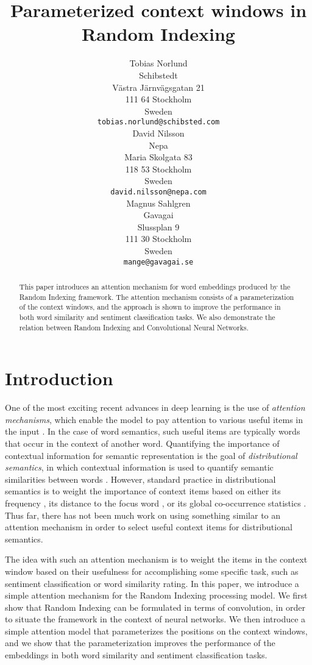 \documentclass[11pt]{article}
\title{Parameterized context windows in Random Indexing}
\author{Tobias Norlund \\
	Schibstedt \\
    Västra Järnvägsgatan 21 \\
    111 64 Stockholm \\
    Sweden \\
	{\tt tobias.norlund@schibsted.com} \\\And
    David Nilsson \\
    Nepa \\
    Maria Skolgata 83 \\
    118 53 Stockholm \\
    Sweden \\
    {\tt david.nilsson@nepa.com} \\\And
    Magnus Sahlgren \\
  	Gavagai \\
  	Slussplan 9 \\
  	111 30 Stockholm \\
  	Sweden \\
  	{\tt mange@gavagai.se}}
\date{}
\begin{document}
\maketitle
\begin{abstract}
This paper introduces an attention mechanism for word embeddings produced by the Random Indexing framework. The attention mechanism consists of a parameterization of the context windows, and the approach is shown to improve the performance in both word similarity and sentiment classification tasks. We also demonstrate the relation between Random Indexing and Convolutional Neural Networks.
\end{abstract}

\section{Introduction}

One of the most exciting recent advances in deep learning is the use of {\em attention mechanisms}, which enable the model to pay attention to various useful items in the input \cite{mnih:2014,Hermann:2015}. In the case of word semantics, such useful items are typically words that occur in the context of another word. Quantifying the importance of contextual information for semantic representation is the goal of {\em distributional semantics}, in which contextual information is used to quantify semantic similarities between words \cite{Turney:Pantel:2010}. However, standard practice in distributional semantics is to weight the importance of context items based on either its frequency \cite{Sahlgren:2016}, its distance to the focus word \cite{Lund:1995}, or its global co-occurrence statistics \cite{Niwa:1994}. Thus far, there has not been much work on using something similar to an attention mechanism in order to select useful context items for distributional semantics.

The idea with such an attention mechanism is to weight the items in the context window based on their usefulness for accomplishing some specific task, such as sentiment classification or word similarity rating. In this paper, we introduce a simple attention mechanism for the Random Indexing processing model. We first show that Random Indexing can be formulated in terms of convolution, in order to situate the framework in the context of neural networks.
We then introduce a simple attention model that parameterizes the positions on the context windows, and we show that the parameterization improves the performance of the embeddings in both word similarity and sentiment classification tasks.
\end{document}
